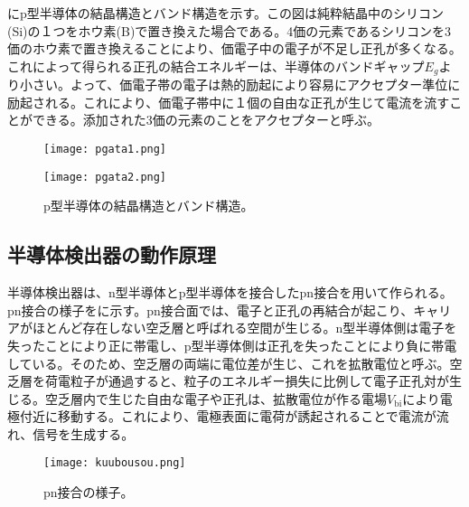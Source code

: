 にp型半導体の結晶構造とバンド構造を示す。この図は純粋結晶中のシリコン(Si)の１つをホウ素(B)で置き換えた場合である。4価の元素であるシリコンを3価のホウ素で置き換えることにより、価電子中の電子が不足し正孔が多くなる。これによって得られる正孔の結合エネルギーは、半導体のバンドギャップ$E_g$より小さい。よって、価電子帯の電子は熱的励起により容易にアクセプター準位に励起される。これにより、価電子帯中に１個の自由な正孔が生じて電流を流すことができる。添加された3価の元素のことをアクセプターと呼ぶ。
\begin{figure}[tbp]
  \begin{minipage}[b]{0.45\linewidth}
    \centering
    \texttt{[image: pgata1.png]}
  \end{minipage}
  \begin{minipage}[b]{0.45\linewidth}
    \centering
    \texttt{[image: pgata2.png]}
  \end{minipage}
  \caption[p型半導体の結晶構造とバンド構造]{p型半導体の結晶構造とバンド構造。}
  \label{fig:pgata}
\end{figure}


\subsection{半導体検出器の動作原理}
\label{sec:pnsetugou}

半導体検出器は、n型半導体とp型半導体を接合したpn接合を用いて作られる。pn接合の様子をに示す。pn接合面では、電子と正孔の再結合が起こり、キャリアがほとんど存在しない空乏層と呼ばれる空間が生じる。n型半導体側は電子を失ったことにより正に帯電し、p型半導体側は正孔を失ったことにより負に帯電している。そのため、空乏層の両端に電位差が生じ、これを拡散電位と呼ぶ。空乏層を荷電粒子が通過すると、粒子のエネルギー損失に比例して電子正孔対が生じる。空乏層内で生じた自由な電子や正孔は、拡散電位が作る電場$V_\mathrm{bi}$により電極付近に移動する。これにより、電極表面に電荷が誘起されることで電流が流れ、信号を生成する。

\begin{figure}[tbp]
  \centering
  \texttt{[image: kuubousou.png]}
  \caption[pn接合の様子]{pn接合の様子。}
  \label{fig:kuubousou}
\end{figure}

